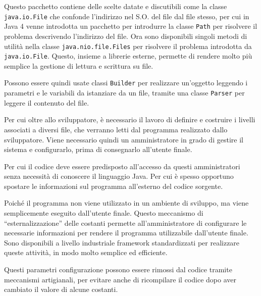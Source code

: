 \documentclass{article}
\numberwithin{equation}{subsection}
\begin{document}
Questo pacchetto contiene delle scelte datate e discutibili come la classe \verb|java.io.File| che confonde l'indirizzo nel S.O. del file dal file stesso, per cui in Java 4 
venne introdotta un pacchetto per introdurre la classe \verb|Path| per risolvere il problema descrivendo l'indirizzo del file. 
Ora sono disponibili singoli metodi di utilità nella classe \verb|java.nio.file.Files| per risolvere il problema introdotta da \verb|java.io.File|. Questo, insieme a librerie 
esterne, permette di rendere molto più semplice la gestione di lettura e scrittura su file. 


Possono essere quindi usate classi \verb|Builder| per realizzare un'oggetto leggendo i parametri e le variabili da istanziare da un file, tramite una classe \verb|Parser| per 
leggere il contenuto del file. 

Per cui oltre allo sviluppatore, è necessario il lavoro di definire e costruire i livelli associati a diversi file, che verranno letti dal programma realizzato dallo 
sviluppatore. Viene necessario quindi un amministratore in grado di gestire il sistema e configurarlo, prima di consegnarlo all'utente finale. 

Per cui il codice deve essere predisposto all'accesso da questi amministratori senza necessità di conoscere il linguaggio Java. Per cui è spesso opportuno spostare le informazioni 
sul programma all'esterno del codice sorgente. 

Poiché il programma non viene utilizzato in un ambiente di sviluppo, ma viene semplicemente eseguito dall'utente finale. 
Questo meccanismo di ``esternalizzazione'' delle costanti permette all'amministratore di configurare le necessarie informazioni per rendere il programma utilizzabile dall'utente 
finale. 
Sono disponibili a livello industriale framework standardizzati per realizzare queste attività, in modo molto semplice ed efficiente. 

Questi parametri configurazione possono essere rimossi dal codice tramite meccanismi artigianali, per evitare anche di ricompilare il codice dopo aver cambiato il valore di 
alcune costanti. 
\end{document}
